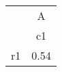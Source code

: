 \begin{tabular}{l*{1}{c}}
\hline\hline
            &           A\\
            &          c1\\
\hline
r1          &        0.54\\
\hline\hline
\end{tabular}
